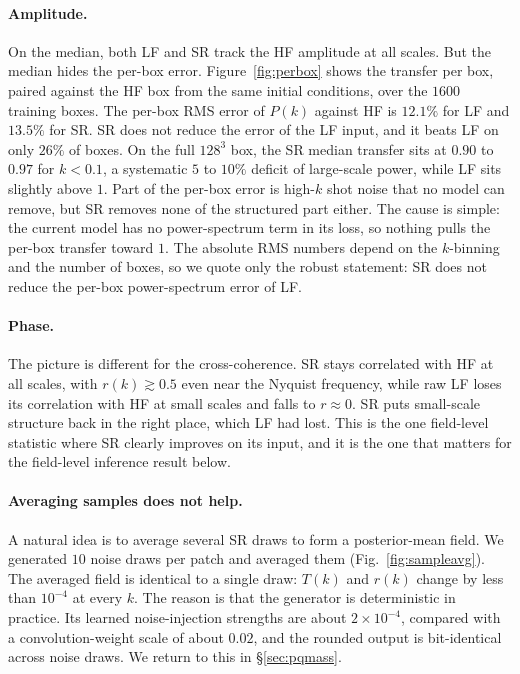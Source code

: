 \documentclass{article} %
\begin{document}
\paragraph{Amplitude.} On the median, both LF and SR track the HF amplitude at all
scales. But the median hides the per-box error. Figure~\ref{fig:perbox} shows the
transfer per box, paired against the HF box from the same initial conditions, over
the $1600$ training boxes. The per-box RMS error of $P(k)$ against HF is $12.1\%$
for LF and $13.5\%$ for SR. SR does not reduce the error of the LF input, and it
beats LF on only $26\%$ of boxes. On the full $128^3$ box, the SR median transfer
sits at $0.90$ to $0.97$ for $k<0.1$, a systematic $5$ to $10\%$ deficit of
large-scale power, while LF sits slightly above $1$. Part of the per-box error is
high-$k$ shot noise that no model can remove, but SR removes none of the structured
part either. The cause is simple: the current model has no power-spectrum term in
its loss, so nothing pulls the per-box transfer toward $1$. The absolute RMS numbers
depend on the $k$-binning and the number of boxes, so we quote only the robust
statement: SR does not reduce the per-box power-spectrum error of LF.

\paragraph{Phase.} The picture is different for the cross-coherence. SR stays
correlated with HF at all scales, with $r(k)\gtrsim 0.5$ even near the Nyquist
frequency, while raw LF loses its correlation with HF at small scales and falls to
$r\approx 0$. SR puts small-scale structure back in the right place, which LF had
lost. This is the one field-level statistic where SR clearly improves on its input,
and it is the one that matters for the field-level inference result below.

\paragraph{Averaging samples does not help.} A natural idea is to average several
SR draws to form a posterior-mean field. We generated $10$ noise draws per patch
and averaged them (Fig.~\ref{fig:sampleavg}). The averaged field is identical to a
single draw: $T(k)$ and $r(k)$ change by less than $10^{-4}$ at every $k$. The
reason is that the generator is deterministic in practice. Its learned
noise-injection strengths are about $2\times10^{-4}$, compared with a
convolution-weight scale of about $0.02$, and the rounded output is bit-identical
across noise draws. We return to this in \S\ref{sec:pqmass}.
\end{document}
